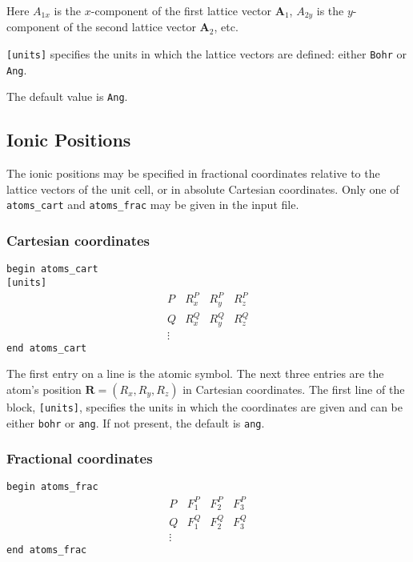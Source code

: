 Here $A_{1x}$ is the $x$-component of the first lattice vector $\mathbf{A}_1$,
$A_{2y}$ is the $y$-component of the second lattice vector $\mathbf{A}_2$, etc.

\verb#[units]# specifies the units in which the lattice vectors are
defined: either \verb#Bohr# or \verb#Ang#. 

The default value is \verb#Ang#.



\subsection[Ionic Positions]{Ionic Positions}

The ionic positions may be specified in fractional coordinates relative
to the lattice vectors of the unit cell, or in absolute Cartesian coordinates.
Only one of \verb#atoms_cart# and \verb#atoms_frac# may be given in the input
file.


\subsubsection{Cartesian coordinates}

\noindent \verb#begin atoms_cart# \\
\verb#[units]#
$$
\begin{array}{cccc}
P  & R^{P}_{x} & R^{P}_{y} & R^{P}_{z} \\
Q  & R^{Q}_{x} & R^{Q}_{y} & R^{Q}_{z} \\
\vdots
\end{array}
$$
\verb#end atoms_cart#


The first entry on a line is the atomic symbol. The next three entries
are the atom's position $\mathbf{R}=(R_x , R_y, R_z)$ in Cartesian
coordinates. The first line of the block, \verb#[units]#, specifies
the units in which the coordinates are given and can be either
\verb#bohr# or \verb#ang#. If not present, the default is \verb#ang#.

\subsubsection{Fractional coordinates}

\noindent \verb#begin atoms_frac#
$$
\begin{array}{cccc}
P  & F^{P}_{1} & F^{P}_{2} & F^{P}_{3} \\
Q  & F^{Q}_{1} & F^{Q}_{2} & F^{Q}_{3} \\
\vdots
\end{array}
$$
\verb#end atoms_frac#

